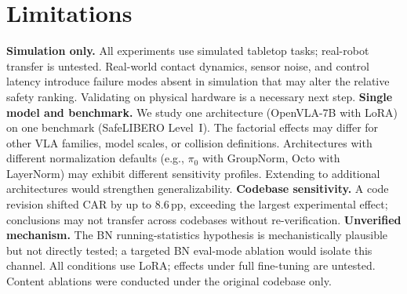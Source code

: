 
\section{Limitations}

\textbf{Simulation only.} All experiments use simulated tabletop tasks; real-robot transfer is untested. Real-world contact dynamics, sensor noise, and control latency introduce failure modes absent in simulation that may alter the relative safety ranking. Validating on physical hardware is a necessary next step.
%
\textbf{Single model and benchmark.} We study one architecture (OpenVLA-7B with LoRA) on one benchmark (SafeLIBERO Level~I). The factorial effects may differ for other VLA families, model scales, or collision definitions. Architectures with different normalization defaults (e.g., $\pi_0$ with GroupNorm, Octo with LayerNorm) may exhibit different sensitivity profiles. Extending to additional architectures would strengthen generalizability.
%
\textbf{Codebase sensitivity.} A code revision shifted CAR by up to 8.6\,pp, exceeding the largest experimental effect; conclusions may not transfer across codebases without re-verification.
%
\textbf{Unverified mechanism.} The BN running-statistics hypothesis is mechanistically plausible but not directly tested; a targeted BN eval-mode ablation would isolate this channel. All conditions use LoRA; effects under full fine-tuning are untested. Content ablations were conducted under the original codebase only.
